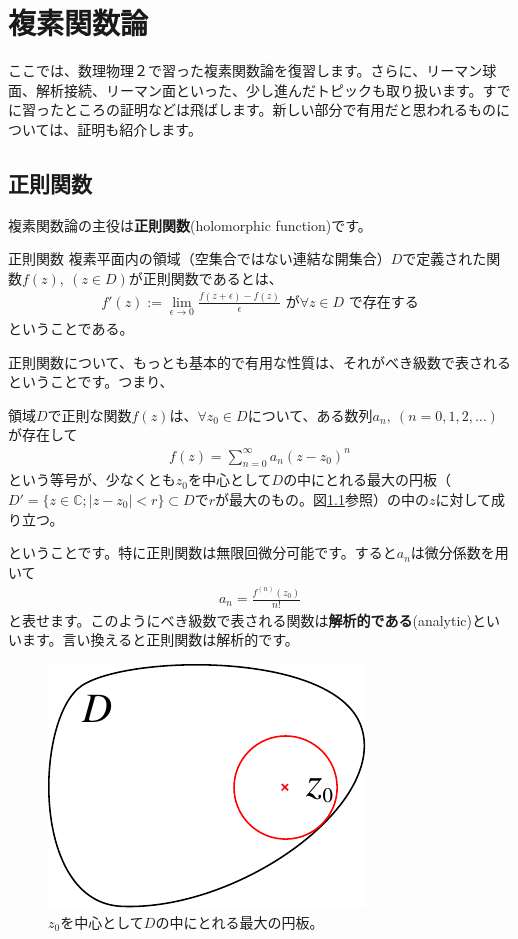\documentclass[report,paper=a4, fontsize=12pt, line_length=16cm, number_of_lines=33,dvipdfmx]{jlreq}
\numberwithin{equation}{section}
\newcommand{\Cb}{\mathbb{C}}
\newcommand{\strong}[1]{\textsf{\bfseries #1}}
\begin{document}
\chapter{複素関数論}
ここでは、数理物理２で習った複素関数論を復習します。さらに、リーマン球面、解析接続、リーマン面といった、少し進んだトピックも取り扱います。すでに習ったところの証明などは飛ばします。新しい部分で有用だと思われるものについては、証明も紹介します。

\section{正則関数}
複素関数論の主役は\strong{正則関数}(holomorphic function)です。
\begin{definition}{正則関数}{}
  複素平面内の領域（空集合ではない連結な開集合）$D$で定義された関数$f(z),\ (z\in D)$が正則関数であるとは、
  \begin{align}
    f'(z):=\lim_{\epsilon\to 0}\frac{f(z+\epsilon)-f(z)}{\epsilon} \text{ が}\forall z \in D \text{ で存在する}
  \end{align}
  ということである。    
\end{definition}

正則関数について、もっとも基本的で有用な性質は、それがべき級数で表されるということです。つまり、
\begin{theor}{}{}
  領域$D$で正則な関数$f(z)$は、$\forall z_0 \in D$について、ある数列$a_n,\ (n=0,1,2,\dots)$が存在して
  \begin{align}
    f(z)=\sum_{n=0}^{\infty}a_n (z-z_0)^n \label{powerseries}
  \end{align}
  という等号が、少なくとも$z_0$を中心として$D$の中にとれる最大の円板（$D'=\{z\in \Cb ; |z-z_0|<r\}\subset D$で$r$が最大のもの。図\ref{fig:maxdisk}参照）の中の$z$に対して成り立つ。  
\end{theor}
ということです。特に正則関数は無限回微分可能です。すると$a_n$は微分係数を用いて
\begin{align}
  a_n=\frac{f^{(n)}(z_0)}{n!}
\end{align}
と表せます。このようにべき級数で表される関数は\strong{解析的である}(analytic)といいます。言い換えると正則関数は解析的です。
\begin{figure}[htbp]
  \centering
  \includegraphics{maxdisk.pdf}
  \caption{$z_0$を中心として$D$の中にとれる最大の円板。}
  \label{fig:maxdisk}
\end{figure}
\end{document}
